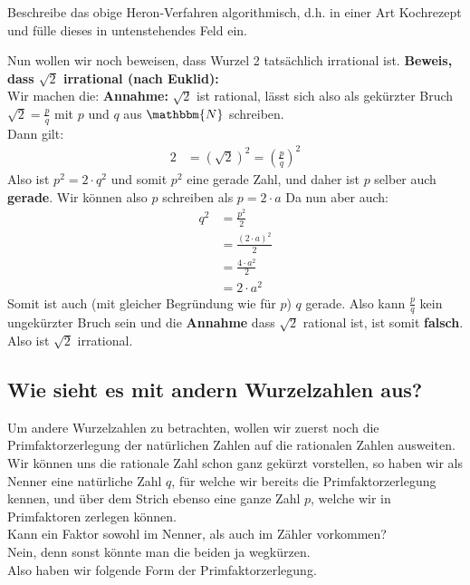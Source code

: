 \begin{aufgabe}
Beschreibe das obige Heron-Verfahren algorithmisch, d.h. in einer Art Kochrezept und fülle dieses in untenstehendes Feld ein. 
\end{aufgabe}
\begin{howto}
\begin{center}
	\vspace{6cm}
\end{center}
\end{howto}
Nun wollen wir noch beweisen, dass Wurzel 2 tatsächlich irrational ist.\newpage\noindent
\textbf{Beweis, dass $\sqrt{2}$ irrational (nach Euklid):}\\
Wir machen die:
\textbf{Annahme:} $\sqrt{2}$ ist rational, lässt sich also als gekürzter Bruch $\sqrt{2}=\tfrac{p}{q}$ mit $p$ und $q$ aus $\mathbbm{N}$ schreiben.\\
Dann gilt:
\begin{align*} 2&=(\sqrt{2})^2=(\tfrac{p}{q})^2
\end{align*}
Also ist $p^2=2\cdot q^2$ und somit $p^2$ eine gerade Zahl, und daher ist $p$ selber auch \textbf{gerade}. Wir können also $p$ schreiben als $p=2\cdot a$
Da nun aber auch:
\begin{align*} q^2&=\tfrac{p^2}{2}\\
&=\tfrac{(2\cdot a)^2}{2}\\
&=\tfrac{4\cdot a^2}{2}\\
&=2\cdot a^2
\end{align*}
Somit ist auch (mit gleicher Begründung wie für $p$) $q$ gerade.
Also kann $\tfrac{p}{q}$ kein ungekürzter Bruch sein und die \textbf{Annahme} dass $\sqrt{2}$ rational ist, ist somit \textbf{falsch}.
Also ist $\sqrt{2}$ irrational.
\subsection*{Wie sieht es mit andern Wurzelzahlen aus?}
Um andere Wurzelzahlen zu betrachten, wollen wir zuerst noch die Primfaktorzerlegung der natürlichen Zahlen auf die rationalen Zahlen ausweiten. Wir können uns die rationale Zahl schon ganz gekürzt vorstellen, so haben wir als Nenner eine natürliche Zahl $q$, für welche wir bereits die Primfaktorzerlegung kennen, und über dem Strich ebenso eine ganze Zahl $p$, welche wir in Primfaktoren zerlegen können.\\
Kann ein Faktor sowohl im Nenner, als auch im Zähler vorkommen?\\
Nein, denn sonst könnte man die beiden ja wegkürzen.\\
Also haben wir folgende Form der Primfaktorzerlegung.

